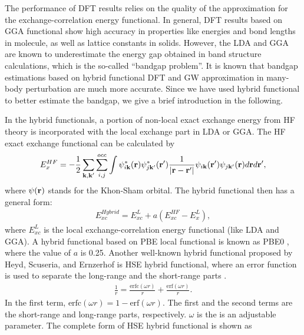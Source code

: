 The performance of DFT results relies on the quality of the approximation for the exchange-correlation energy functional. In general, DFT results based on GGA functional show high accuracy in properties like energies and bond lengths in molecule, as well as lattice constants in solids. However, the LDA and GGA are known to underestimate the energy gap obtained in band structure calculations, which is the so-called ``bandgap problem''. It is known that bandgap estimations based on hybrid functional DFT and GW approximation in many-body perturbation are much more accurate. Since we have used hybrid functional to better estimate the bandgap, we give a brief introduction in the following.

In the hybrid functionals, a portion of non-local exact exchange energy from HF theory is incorporated with the local exchange part in LDA or GGA. The HF exact exchange functional can be calculated by
	\begin{equation}
	\begin{aligned}
        E_x^{HF} = -\frac{1}{2} \sum_{\textbf{k},\textbf{k}'}\sum_{i,j}^{occ} \int \psi_{i{\bf k}}^*({\bf r}) \psi_{j{\bf k}'}^*({\bf r}') \frac{1}{|{\bf r}-{\bf r}'|} \psi_{i{\bf k}}({\bf r'}) \psi_{j{\bf k}'}({\bf r}) d{\bf r} d{\bf r}',
    \end{aligned}
	\end{equation}
where $\psi({\bf r})$ stands for the Khon-Sham orbital. The hybrid functional then has a general form:
	\begin{equation}
	\begin{aligned}
        E_{xc}^{Hybrid} = E_{xc}^{L} + a(E_{xc}^{HF} - E_{x}^{L}),
    \end{aligned}
	\end{equation}
where $E_{xc}^{L}$ is the local exchange-correlation energy functional (like LDA and GGA). A hybrid functional based on PBE local functional is known as PBE0 \cite{perdew1996rationale}, where the value of $a$ is 0.25. Another well-known hybrid functional proposed by Heyd, Scuseria, and Ernzerhof is HSE hybrid functional, where an error function is used to separate
the long-range and the short-range parts \cite{heyd2003hybrid}.
	\begin{equation}
	\begin{aligned}
        \frac{1}{r} = \frac{\text{erfc}(\omega r)}{r} + \frac{\text{erf}(\omega r)}{r}.
    \end{aligned}
	\end{equation}
In the first term, $\text{erfc} (\omega r) = 1 - \text{erf}(\omega r)$. The first and the second terms are the short-range and long-range parts, respectively. $\omega$ is the  is an adjustable parameter. The complete form of HSE hybrid functional is shown as
